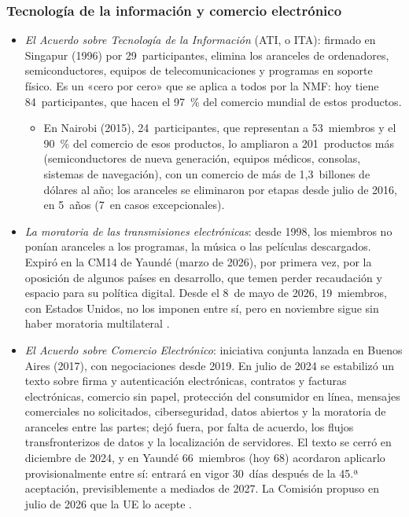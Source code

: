 \documentclass[11pt]{article}
\begin{document}
\subsubsection{Tecnología de la información y comercio electrónico}\label{sec:digital}

\begin{itemize}
\item \emph{El Acuerdo sobre Tecnología de la Información} (ATI, o ITA): firmado en Singapur (1996) por 29~participantes, elimina los aranceles de ordenadores, semiconductores, equipos de telecomunicaciones y programas en soporte físico. Es un «cero por cero» que se aplica a todos por la NMF: hoy tiene 84~participantes, que hacen el 97~\% del comercio mundial de estos productos\nocite{OMC2026ATI}.
  \begin{itemize}
  \item En Nairobi (2015), 24~participantes, que representan a 53~miembros y el 90~\% del comercio de esos productos, lo ampliaron a 201~productos más (semiconductores de nueva generación, equipos médicos, consolas, sistemas de navegación), con un comercio de más de 1,3~billones de dólares al año; los aranceles se eliminaron por etapas desde julio de 2016, en 5~años (7~en casos excepcionales)\nocite{OMC2026ATIAmpliacion}.
  \end{itemize}
\item \emph{La moratoria de las transmisiones electrónicas}: desde 1998, los miembros no ponían aranceles a los programas, la música o las películas descargados. Expiró en la CM14 de Yaundé (marzo de 2026), por primera vez, por la oposición de algunos países en desarrollo, que temen perder recaudación y espacio para su política digital. Desde el 8~de mayo de 2026, 19~miembros, con Estados Unidos, no los imponen entre sí, pero en noviembre sigue sin haber moratoria multilateral\nocite{OMC2026CM14} .
\item \emph{El Acuerdo sobre Comercio Electrónico}: iniciativa conjunta lanzada en Buenos Aires (2017), con negociaciones desde 2019. En julio de 2024 se estabilizó un texto sobre firma y autenticación electrónicas, contratos y facturas electrónicas, comercio sin papel, protección del consumidor en línea, mensajes comerciales no solicitados, ciberseguridad, datos abiertos y la moratoria de aranceles entre las partes; dejó fuera, por falta de acuerdo, los flujos transfronterizos de datos y la localización de servidores. El texto se cerró en diciembre de 2024, y en Yaundé 66~miembros (hoy 68) acordaron aplicarlo provisionalmente entre sí: entrará en vigor 30~días después de la 45.ª aceptación, previsiblemente a mediados de 2027. La Comisión propuso en julio de 2026 que la UE lo acepte\nocite{OMC2026ComercioElectronico} .
\end{itemize}
\end{document}
